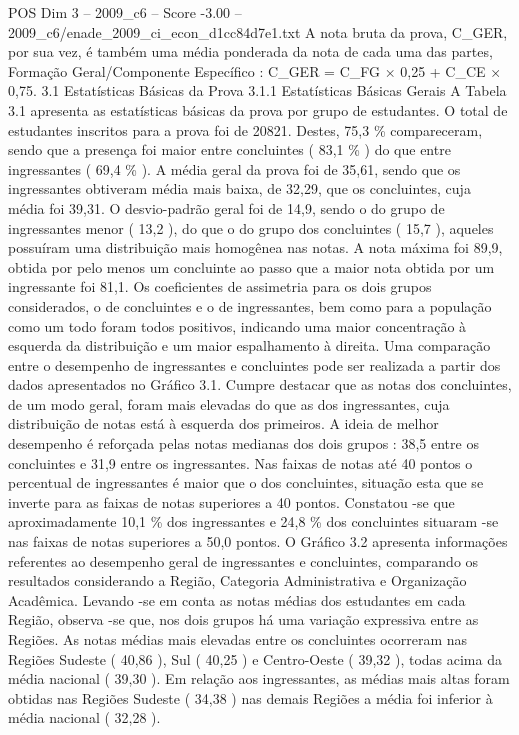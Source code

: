 \begin{textsample}{POS Dim 3 – 2009\_c6 – Score -3.00 – 2009\_c6/enade\_2009\_ci\_econ\_d1cc84d7e1.txt}
A nota bruta da prova, C\_GER, por sua vez, é também uma média ponderada da nota de cada uma das partes, Formação Geral/Componente Específico : C\_GER = C\_FG × 0,25 + C\_CE × 0,75. 3.1 Estatísticas Básicas da Prova 3.1.1 Estatísticas Básicas Gerais A Tabela 3.1 apresenta as estatísticas básicas da prova por grupo de estudantes.
O total de estudantes inscritos para a prova foi de 20821.
Destes, 75,3 \% compareceram, sendo que a presença foi maior entre concluintes ( 83,1 \% ) do que entre ingressantes ( 69,4 \% ).
A média geral da prova foi de 35,61, sendo que os ingressantes obtiveram média mais baixa, de 32,29, que os concluintes, cuja média foi 39,31.
O desvio-padrão geral foi de 14,9, sendo o do grupo de ingressantes menor ( 13,2 ), do que o do grupo dos concluintes ( 15,7 ), aqueles possuíram uma distribuição mais homogênea nas notas.
A nota máxima foi 89,9, obtida por pelo menos um concluinte ao passo que a maior nota obtida por um ingressante foi 81,1.
Os coeficientes de assimetria para os dois grupos considerados, o de concluintes e o de ingressantes, bem como para a população como um todo foram todos positivos, indicando uma maior concentração à esquerda da distribuição e um maior espalhamento à direita.
Uma comparação entre o desempenho de ingressantes e concluintes pode ser realizada a partir dos dados apresentados no Gráfico 3.1.
Cumpre destacar que as notas dos concluintes, de um modo geral, foram mais elevadas do que as dos ingressantes, cuja distribuição de notas está à esquerda dos primeiros.
A ideia de melhor desempenho é reforçada pelas notas medianas dos dois grupos : 38,5 entre os concluintes e 31,9 entre os ingressantes.
Nas faixas de notas até 40 pontos o percentual de ingressantes é maior que o dos concluintes, situação esta que se inverte para as faixas de notas superiores a 40 pontos.
Constatou -se que aproximadamente 10,1 \% dos ingressantes e 24,8 \% dos concluintes situaram -se nas faixas de notas superiores a 50,0 pontos.
O Gráfico 3.2 apresenta informações referentes ao desempenho geral de ingressantes e concluintes, comparando os resultados considerando a Região, Categoria Administrativa e Organização Acadêmica.
Levando -se em conta as notas médias dos estudantes em cada Região, observa -se que, nos dois grupos há uma variação expressiva entre as Regiões.
As notas médias mais elevadas entre os concluintes ocorreram nas Regiões Sudeste ( 40,86 ), Sul ( 40,25 ) e Centro-Oeste ( 39,32 ), todas acima da média nacional ( 39,30 ).
Em relação aos ingressantes, as médias mais altas foram obtidas nas Regiões Sudeste ( 34,38 ) nas demais Regiões a média foi inferior à média nacional ( 32,28 ).

\end{textsample}
